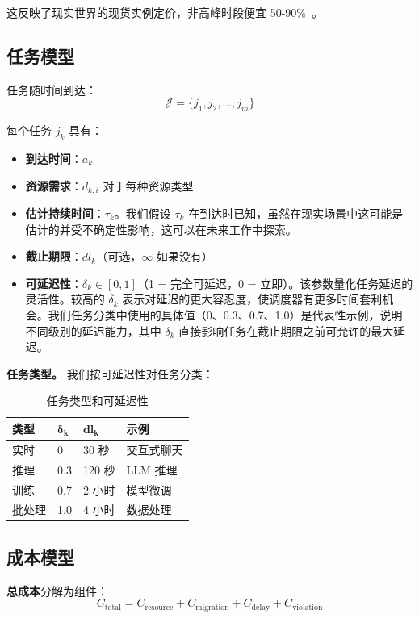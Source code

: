 \documentclass[10pt,a4paper]{article}
\begin{document}
这反映了现实世界的现货实例定价，非高峰时段便宜 50-90\%~\cite{aws2025spot}。

\subsection{任务模型}

任务随时间到达：
\begin{equation}
\mathcal{J} = \{j_1, j_2, \ldots, j_m\}
\end{equation}

每个任务 $j_k$ 具有：
\begin{itemize}
    \item \textbf{到达时间}：$a_k$
    \item \textbf{资源需求}：$d_{k,i}$ 对于每种资源类型
    \item \textbf{估计持续时间}：$\tau_k$。我们假设 $\tau_k$ 在到达时已知，虽然在现实场景中这可能是估计的并受不确定性影响，这可以在未来工作中探索。
    \item \textbf{截止期限}：$dl_k$（可选，$\infty$ 如果没有）
    \item \textbf{可延迟性}：$\delta_k \in [0, 1]$（1 = 完全可延迟，0 = 立即）。该参数量化任务延迟的灵活性。较高的 $\delta_k$ 表示对延迟的更大容忍度，使调度器有更多时间套利机会。我们任务分类中使用的具体值（0、0.3、0.7、1.0）是代表性示例，说明不同级别的延迟能力，其中 $\delta_k$ 直接影响任务在截止期限之前可允许的最大延迟。
\end{itemize}

\textbf{任务类型。} 我们按可延迟性对任务分类：
\begin{table}[h]
\centering
\caption{任务类型和可延迟性}
\label{tab:tasks}
\begin{tabular}{@{}llll@{}}
\toprule
\textbf{类型} & $\boldsymbol{\delta_k}$ & $\boldsymbol{dl_k}$ & \textbf{示例} \\ \midrule
实时 & 0 & 30 秒 & 交互式聊天 \\
推理 & 0.3 & 120 秒 & LLM 推理 \\
训练 & 0.7 & 2 小时 & 模型微调 \\
批处理 & 1.0 & 4 小时 & 数据处理 \\ \bottomrule
\end{tabular}
\end{table}

\subsection{成本模型}

\textbf{总成本}分解为组件：
\begin{equation}
C_{\text{total}} = C_{\text{resource}} + C_{\text{migration}} + C_{\text{delay}} + C_{\text{violation}}
\end{equation}
\end{document}
